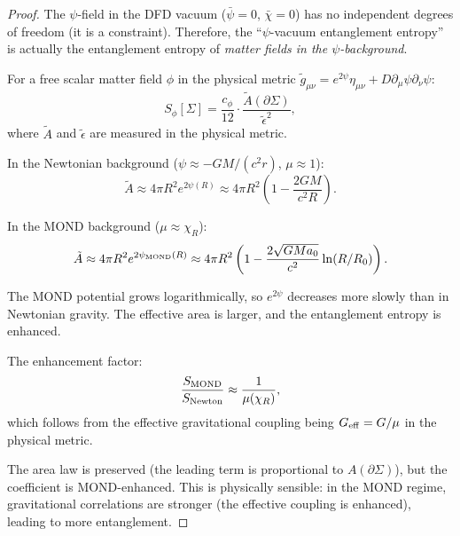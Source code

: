 \documentclass[11pt,a4paper]{article}
\begin{document}
\begin{proof}
The $\psi$-field in the DFD vacuum ($\bar\psi = 0$, $\bar\chi = 0$) has no independent degrees of freedom (it is a constraint). Therefore, the ``$\psi$-vacuum entanglement entropy'' is actually the entanglement entropy of \emph{matter fields in the $\psi$-background}.

For a free scalar matter field $\phi$ in the physical metric $\tilde{g}_{\mu\nu} = e^{2\psi}\eta_{\mu\nu} + D\partial_\mu\psi\partial_\nu\psi$:
\begin{equation}
S_\phi[\Sigma] = \frac{c_\phi}{12}\cdot\frac{\tilde{A}(\partial\Sigma)}{\tilde\epsilon^2},
\end{equation}
where $\tilde{A}$ and $\tilde\epsilon$ are measured in the physical metric.

In the Newtonian background ($\psi \approx -GM/(c^2 r)$, $\mu \approx 1$):
\begin{equation}
\tilde{A} \approx 4\pi R^2 e^{2\psi(R)} \approx 4\pi R^2\left(1 - \frac{2GM}{c^2 R}\right).
\end{equation}

In the MOND background ($\mu \approx \chi_R$):
\begin{equation}
\tilde{A} \approx 4\pi R^2 e^{2\psi_{\rm MOND}(R)} \approx 4\pi R^2\left(1 - \frac{2\sqrt{GMa_0}}{c^2}\ln(R/R_0)\right).
\end{equation}

The MOND potential grows logarithmically, so $e^{2\psi}$ decreases more slowly than in Newtonian gravity. The effective area is larger, and the entanglement entropy is enhanced.

The enhancement factor:
\begin{equation}
\frac{S_{\rm MOND}}{S_{\rm Newton}} \approx \frac{1}{\mu(\chi_R)},
\end{equation}
which follows from the effective gravitational coupling being $G_{\rm eff} = G/\mu$ in the physical metric.

The area law is preserved (the leading term is proportional to $A(\partial\Sigma)$), but the coefficient is MOND-enhanced. This is physically sensible: in the MOND regime, gravitational correlations are stronger (the effective coupling is enhanced), leading to more entanglement.
\end{proof}
\end{document}
